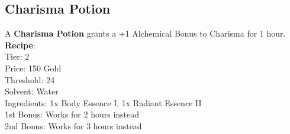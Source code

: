 \subsection{Charisma Potion}\label{potion:charismaPotion}
A \textbf{Charisma Potion} grants a +1 Alchemical Bonus to Charisma for 1 hour.\\
\textbf{Recipe}:\\
Tier: 2\\
Price: 150 Gold\\
Threshold: 24\\
Solvent: Water\\
Ingredients: 1x Body Essence I, 1x Radiant Essence II\\
1st Bonus: Works for 2 hours instead\\
2nd Bonus: Works for 3 hours instead